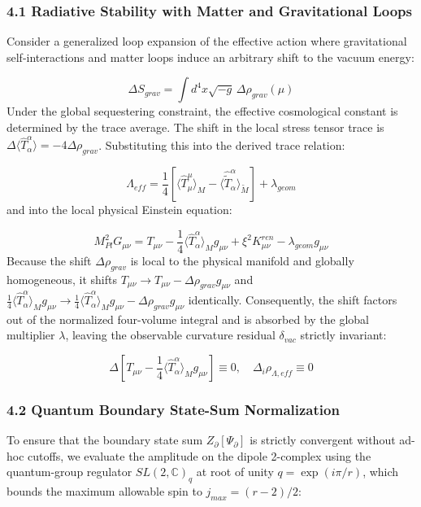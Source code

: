 \documentclass[aps,prd,onecolumn,superscriptaddress,nofootinbib,longbibliography,10pt]{revtex4-2}
\begin{document}
  
  
\subsubsection*{4.1 Radiative Stability with Matter and Gravitational Loops}

  Consider a generalized loop expansion of the effective action where gravitational self-interactions and matter loops induce an arbitrary shift to the vacuum energy:


  \[ \Delta S_{grav} = \int d^4x\sqrt{-g}\,\Delta\rho_{grav}(\mu) \]
  Under the global sequestering constraint, the effective cosmological constant is determined by the trace average. The shift in the local stress tensor trace is \(\Delta\langle \hat{T}^\alpha_\alpha \rangle = -4\Delta\rho_{grav}\). Substituting this into the derived trace relation:


  \[ \Lambda_{eff} = \frac{1}{4}\left[ \langle \hat{T}^\mu_\mu \rangle_M - \langle \hat{\tilde{T}}^\alpha_\alpha \rangle_{\tilde{M}} \right] + \lambda_{geom} \]
  and into the local physical Einstein equation:


  \[ M_{Pl}^2 G_{\mu\nu} = T_{\mu\nu} - \frac{1}{4}\langle \hat{T}^\alpha_\alpha \rangle_M g_{\mu\nu} + \xi^2 K_{\mu\nu}^{ren} - \lambda_{geom}g_{\mu\nu} \]
  Because the shift \(\Delta\rho_{grav}\) is local to the physical manifold and globally homogeneous, it shifts \(T_{\mu\nu} \to T_{\mu\nu} - \Delta\rho_{grav}g_{\mu\nu}\) and \(\frac{1}{4}\langle \hat{T}^\alpha_\alpha \rangle_M g_{\mu\nu} \to \frac{1}{4}\langle \hat{T}^\alpha_\alpha \rangle_M g_{\mu\nu} - \Delta\rho_{grav}g_{\mu\nu}\) identically. Consequently, the shift factors out of the normalized four-volume integral and is absorbed by the global multiplier \(\lambda\), leaving the observable curvature residual \(\delta_{vac}\) strictly invariant:


  \[ \Delta\left[ T_{\mu\nu} - \frac{1}{4}\langle \hat{T}^\alpha_\alpha \rangle_M g_{\mu\nu} \right] \equiv 0, \quad \Delta_i\rho_{\Lambda,eff} \equiv 0 \]

  
\subsubsection*{4.2 Quantum Boundary State-Sum Normalization}

  To ensure that the boundary state sum \(Z_\partial[\Psi_\partial]\) is strictly convergent without ad-hoc cutoffs, we evaluate the amplitude on the dipole 2-complex using the quantum-group regulator \(SL(2,\mathbb{C})_q\) at root of unity \(q = \exp(i\pi/r)\), which bounds the maximum allowable spin to \(j_{max} = (r - 2)/2\):
\end{document}

